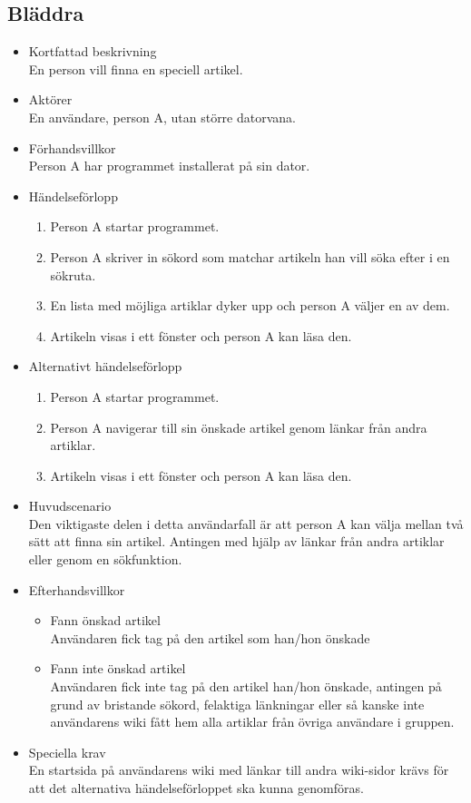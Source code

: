 \subsection{Bläddra}

\begin{itemize}
	\item Kortfattad beskrivning
	\\En person vill finna en speciell artikel.
	\item Aktörer
	\\En användare, person A, utan större datorvana.
	\item Förhandsvillkor
	\\Person A har programmet installerat på sin dator.
	\item Händelseförlopp
	\begin{enumerate}
		\item Person A startar programmet.
		\item Person A skriver in sökord som matchar artikeln han vill söka efter i en sökruta.
		\item En lista med möjliga artiklar dyker upp och person A väljer en av dem.
		\item Artikeln visas i ett fönster och person A kan läsa den.
	\end{enumerate}
	\item Alternativt händelseförlopp
	\begin{enumerate}
		\item Person A startar programmet.
		\item Person A navigerar till sin önskade artikel genom länkar från andra artiklar.	
		\item Artikeln visas i ett fönster och person A kan läsa den.
	\end{enumerate}	
	\item Huvudscenario
	\\Den viktigaste delen i detta användarfall är att person A kan välja mellan två sätt att finna sin artikel. Antingen med hjälp av länkar från andra artiklar eller genom en sökfunktion.
	\item Efterhandsvillkor
	\begin{itemize}
	\item Fann önskad artikel
	\\Användaren fick tag på den artikel som han/hon önskade
	\item Fann inte önskad artikel
	\\Användaren fick inte tag på den artikel han/hon önskade, antingen på grund av bristande sökord, felaktiga länkningar eller så kanske inte användarens wiki fått hem alla artiklar från övriga användare i gruppen.
	\end{itemize}
	\item Speciella krav
	\\En startsida på användarens wiki med länkar till andra wiki-sidor krävs för att det alternativa händelseförloppet ska kunna genomföras.
\end{itemize}


